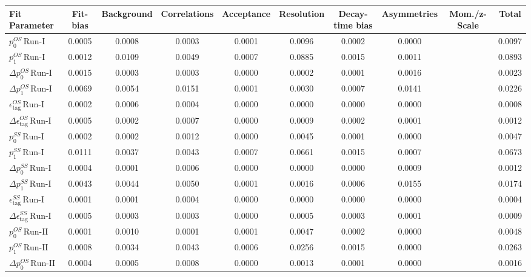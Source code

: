 \begin{tabular}{l  c  c  c  c  c  c  c  c  | c }
\hline
\hline
Fit Parameter & Fit-bias & Background & Correlations & Acceptance & Resolution & Decay-time bias & Asymmetries & Mom./z-Scale &  Total  \\ 
\hline
$p_{0}^{OS} \, \text{Run-I}$ & 0.0005 & 0.0008 & 0.0003 & 0.0001 & 0.0096 & 0.0002 & 0.0000 &  & 0.0097 \\ 
$p_{1}^{OS} \, \text{Run-I}$ & 0.0012 & 0.0109 & 0.0049 & 0.0007 & 0.0885 & 0.0015 & 0.0011 &  & 0.0893 \\ 
$\Delta p_{0}^{OS} \, \text{Run-I}$ & 0.0015 & 0.0003 & 0.0003 & 0.0000 & 0.0002 & 0.0001 & 0.0016 &  & 0.0023 \\ 
$\Delta p_{1}^{OS} \, \text{Run-I}$ & 0.0069 & 0.0054 & 0.0151 & 0.0001 & 0.0030 & 0.0007 & 0.0141 &  & 0.0226 \\ 
$\epsilon_{\text{tag}}^{OS} \, \text{Run-I}$ & 0.0002 & 0.0006 & 0.0004 & 0.0000 & 0.0000 & 0.0000 & 0.0000 &  & 0.0008 \\ 
$\Delta \epsilon_{\text{tag}}^{OS} \, \text{Run-I}$ & 0.0005 & 0.0002 & 0.0007 & 0.0000 & 0.0009 & 0.0002 & 0.0001 &  & 0.0012 \\ 
$p_{0}^{SS} \, \text{Run-I}$ & 0.0002 & 0.0002 & 0.0012 & 0.0000 & 0.0045 & 0.0001 & 0.0000 &  & 0.0047 \\ 
$p_{1}^{SS} \, \text{Run-I}$ & 0.0111 & 0.0037 & 0.0043 & 0.0007 & 0.0661 & 0.0015 & 0.0007 &  & 0.0673 \\ 
$\Delta p_{0}^{SS} \, \text{Run-I}$ & 0.0004 & 0.0001 & 0.0006 & 0.0000 & 0.0000 & 0.0000 & 0.0009 &  & 0.0012 \\ 
$\Delta p_{1}^{SS} \, \text{Run-I}$ & 0.0043 & 0.0044 & 0.0050 & 0.0001 & 0.0016 & 0.0006 & 0.0155 &  & 0.0174 \\ 
$\epsilon_{\text{tag}}^{SS} \, \text{Run-I}$ & 0.0001 & 0.0001 & 0.0004 & 0.0000 & 0.0000 & 0.0000 & 0.0000 &  & 0.0004 \\ 
$\Delta \epsilon_{\text{tag}}^{SS} \, \text{Run-I}$ & 0.0005 & 0.0003 & 0.0003 & 0.0000 & 0.0005 & 0.0003 & 0.0001 &  & 0.0009 \\ 
$p_{0}^{OS} \, \text{Run-II}$ & 0.0001 & 0.0010 & 0.0001 & 0.0001 & 0.0047 & 0.0002 & 0.0000 &  & 0.0048 \\ 
$p_{1}^{OS} \, \text{Run-II}$ & 0.0008 & 0.0034 & 0.0043 & 0.0006 & 0.0256 & 0.0015 & 0.0000 &  & 0.0263 \\ 
$\Delta p_{0}^{OS} \, \text{Run-II}$ & 0.0004 & 0.0005 & 0.0008 & 0.0000 & 0.0013 & 0.0001 & 0.0000 &  & 0.0016 \\ 

\end{tabular}
